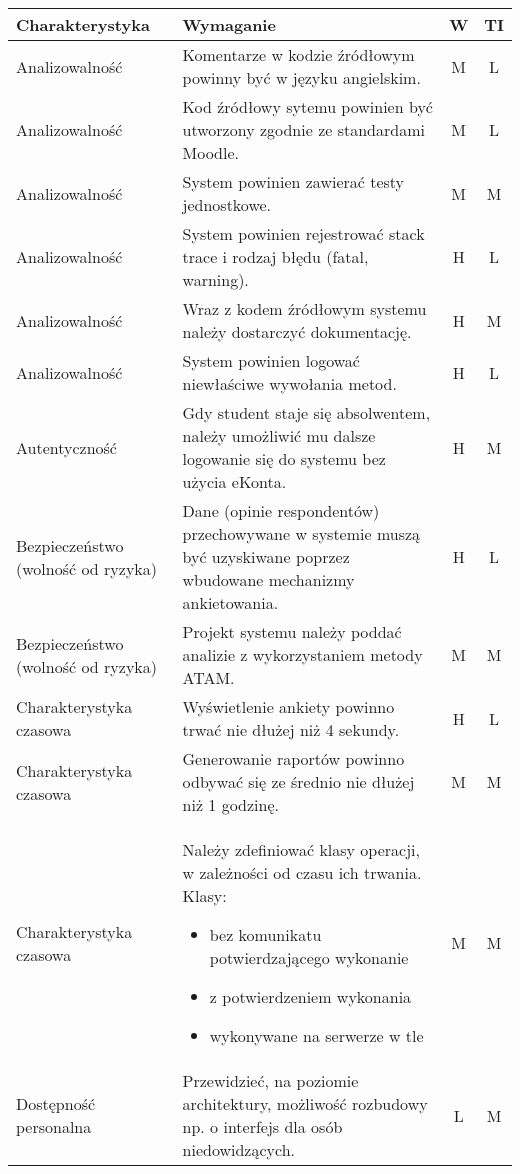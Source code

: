 \newpage
\begin{center}
\begin{longtable}{ | p{4cm} | p{9cm} | c | c | }
\hline
\textbf{Charakterystyka} & \textbf{Wymaganie} & \textbf{W} & \textbf{TI} \\ \hline
%
Analizowalność & Komentarze w kodzie źródłowym powinny być w języku angielskim. & M & L \\ \hline
Analizowalność & Kod źródłowy sytemu powinien być utworzony zgodnie ze standardami Moodle. & M & L \\ \hline
Analizowalność & System powinien zawierać testy jednostkowe. & M & M \\ \hline
Analizowalność & System powinien rejestrować stack trace i rodzaj błędu (fatal, warning). & H & L \\ \hline
Analizowalność & Wraz z kodem źródłowym systemu należy dostarczyć dokumentację. & H & M \\ \hline
Analizowalność & System powinien logować niewłaściwe wywołania metod. & H & L \\ \hline
%
Autentyczność & Gdy student staje się absolwentem, należy umożliwić mu dalsze logowanie się do systemu bez użycia eKonta. & H & M \\ \hline
%
Bezpieczeństwo (wolność od ryzyka) & Dane (opinie respondentów) przechowywane w systemie muszą być uzyskiwane poprzez wbudowane mechanizmy ankietowania. & H & L \\ \hline
Bezpieczeństwo (wolność od ryzyka) & Projekt systemu należy poddać analizie z wykorzystaniem metody ATAM. & M & M \\ \hline
%
Charakterystyka czasowa & Wyświetlenie ankiety powinno trwać nie dłużej niż 4 sekundy. & H & L \\ \hline
Charakterystyka czasowa & Generowanie raportów powinno odbywać się ze średnio nie dłużej niż 1 godzinę. & M & M \\ \hline
Charakterystyka czasowa & Należy zdefiniować klasy operacji, w zależności od czasu ich trwania. Klasy:
\begin{itemize}
\item{bez komunikatu potwierdzającego wykonanie}
\item{z potwierdzeniem wykonania}
\item{wykonywane na serwerze w tle}
\end{itemize} & M & M \\ \hline
%
Dostępność personalna & Przewidzieć, na poziomie architektury, możliwość rozbudowy np. o interfejs dla osób niedowidzących. & L & M \\ \hline

\end{longtable}
\end{center}
